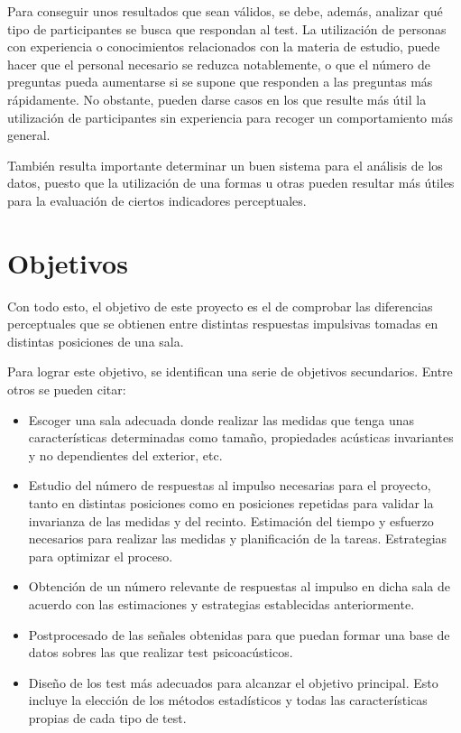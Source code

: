 \documentclass[11pt,a4paper,twoside]{book}
\begin{document}
    Para conseguir unos resultados que sean válidos, se debe, además, analizar qué tipo de participantes se busca que respondan al test. La utilización de personas con experiencia o conocimientos relacionados con la materia de estudio, puede hacer que el personal necesario se reduzca notablemente, o que el número de preguntas pueda aumentarse si se supone que responden a las preguntas más rápidamente. No obstante, pueden darse casos en los que resulte más útil la utilización de participantes sin experiencia para recoger un comportamiento más general.
    
    También resulta importante determinar un buen sistema para el análisis de los datos, puesto que la utilización de una formas u otras pueden resultar más útiles para la evaluación de ciertos indicadores perceptuales.
    
    \section{Objetivos}
        Con todo esto, el objetivo de este proyecto es el de comprobar las diferencias perceptuales que se obtienen entre distintas respuestas impulsivas tomadas en distintas posiciones de una sala.
        
        Para lograr este objetivo, se identifican una serie de objetivos secundarios. Entre otros se pueden citar:
        
        \begin{itemize}
            \item Escoger una sala adecuada donde realizar las medidas que tenga unas características determinadas como tamaño, propiedades acústicas invariantes y no dependientes del exterior, etc.
            \item Estudio del número de respuestas al impulso necesarias para el proyecto, tanto en distintas posiciones como en posiciones repetidas para validar la invarianza de las medidas y del recinto. Estimación del tiempo y esfuerzo necesarios para realizar las medidas y planificación de la tareas. Estrategias para optimizar el proceso.
            \item Obtención de un número relevante de respuestas al impulso en dicha sala de acuerdo con las estimaciones y estrategias establecidas anteriormente.
            \item Postprocesado de las señales obtenidas para que puedan formar una base de datos sobres las que realizar test psicoacústicos.
            \item Diseño de los test más adecuados para alcanzar el objetivo principal. Esto incluye la elección de los métodos estadísticos y todas las características propias de cada tipo de test.
      
        \end{itemize}
        
\end{document}
